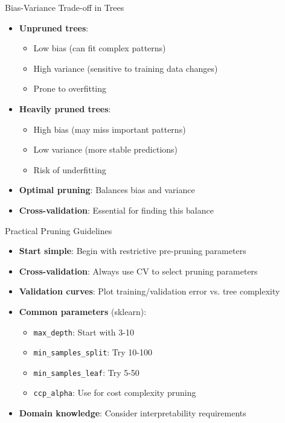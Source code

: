 \documentclass[usenames,dvipsnames]{beamer}
\begin{document}
\begin{frame}{Bias-Variance Trade-off in Trees}
\begin{itemize}
\item \textbf{Unpruned trees}:
    \begin{itemize}
    \item Low bias (can fit complex patterns)
    \pause
\item High variance (sensitive to training data changes)
    \item Prone to overfitting
    \end{itemize}
\item \textbf{Heavily pruned trees}:
    \begin{itemize}
\item High bias (may miss important patterns)
    \item Low variance (more stable predictions)
    \pause
\item Risk of underfitting
    \end{itemize}
\item \textbf{Optimal pruning}: Balances bias and variance
\item \textbf{Cross-validation}: Essential for finding this balance
\end{itemize}
\end{frame}

\begin{frame}{Practical Pruning Guidelines}
\begin{itemize}
\item \textbf{Start simple}: Begin with restrictive pre-pruning parameters
\pause
\item \textbf{Cross-validation}: Always use CV to select pruning parameters
\pause
\item \textbf{Validation curves}: Plot training/validation error vs. tree complexity
\pause
\item \textbf{Common parameters} (sklearn):
    \begin{itemize}
    \item \texttt{max\_depth}: Start with 3-10
    \pause
\item \texttt{min\_samples\_split}: Try 10-100
    \item \texttt{min\_samples\_leaf}: Try 5-50
    \item \texttt{ccp\_alpha}: Use for cost complexity pruning
    \end{itemize}
\item \textbf{Domain knowledge}: Consider interpretability requirements
\end{itemize}
\end{frame}
\end{document}
